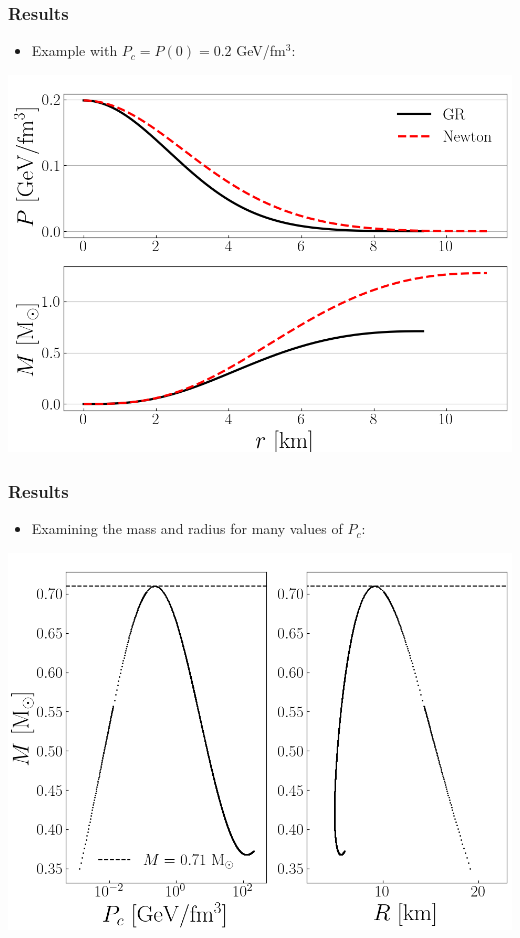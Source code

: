\documentclass{beamer}
\begin{document}
\begin{frame}
\frametitle{Results}
\begin{itemize}
    \item Example with $P_c = P(0) = 0.2$ GeV/fm$^3$:
\end{itemize}
\begin{center}
    \includegraphics[scale=0.4]{Newt.png}
\end{center}
\end{frame}

\begin{frame}
\frametitle{Results}
\begin{itemize}
    \item Examining the mass and radius for many values of $P_c$:
\end{itemize}
\begin{center}
    \includegraphics[scale=0.4]{TOV_limit.png}
\end{center}
\end{frame}
\end{document}
